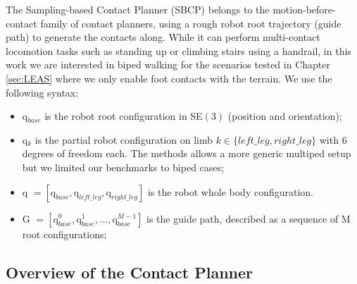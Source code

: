 The Sampling-based Contact Planner (SBCP) \cite{AcyclicCP} belongs to the motion-before-contact family of contact planners, using a rough robot root trajectory (guide path) to generate the contacts along.
While it can perform multi-contact locomotion tasks such as standing up or climbing stairs using a handrail, in this work we are interested in biped walking for the scenarios tested in Chapter \ref{sec:LEAS} where we only enable foot contacts with the terrain.
We use the following syntax:
\begin{itemize}
    \item q$_{base}$ is the robot root configuration in SE$(3)$ (position and orientation);
    \item q$_k$ is the partial robot configuration on limb $k\in\{left\_leg, right\_leg\}$ with 6 degrees of freedom each. The methods allows a more generic multiped setup but we limited our benchmarks to biped cases;
    \item q $= [\mbox{q}_{base},\mbox{q}_{left\_leg},\mbox{q}_{right\_leg}]$ is the robot whole body configuration.
    \item G $ = [\mbox{q}_{base}^0,\mbox{q}_{base}^1,..., \mbox{q}_{base}^{M-1}]$ is the guide path, described as a sequence of M root configurations;
\end{itemize}



\subsection{Overview of the Contact Planner}


